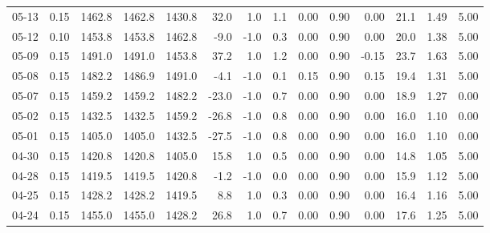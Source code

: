 \begin{threeparttable}
{\begin{tabular}{lrrrrrrrrrrrrr}
  05-13 &     0.15 & 1462.8 & 1462.8 & 1430.8 &       32.0 &                      1.0 &                 1.1 &       0.00 &      0.90 &           0.00 &             21.1 &            1.49 &                   5.00 \\
  05-12 &     0.10 & 1453.8 & 1453.8 & 1462.8 &       -9.0 &                     -1.0 &                 0.3 &       0.00 &      0.90 &           0.00 &             20.0 &            1.38 &                   5.00 \\
  05-09 &     0.15 & 1491.0 & 1491.0 & 1453.8 &       37.2 &                      1.0 &                 1.2 &       0.00 &      0.90 &          -0.15 &             23.7 &            1.63 &                   5.00 \\
  05-08 &     0.15 & 1482.2 & 1486.9 & 1491.0 &       -4.1 &                     -1.0 &                 0.1 &       0.15 &      0.90 &           0.15 &             19.4 &            1.31 &                   5.00 \\
  05-07 &     0.15 & 1459.2 & 1459.2 & 1482.2 &      -23.0 &                     -1.0 &                 0.7 &       0.00 &      0.90 &           0.00 &             18.9 &            1.27 &                   0.00 \\
  05-02 &     0.15 & 1432.5 & 1432.5 & 1459.2 &      -26.8 &                     -1.0 &                 0.8 &       0.00 &      0.90 &           0.00 &             16.0 &            1.10 &                   0.00 \\
  05-01 &     0.15 & 1405.0 & 1405.0 & 1432.5 &      -27.5 &                     -1.0 &                 0.8 &       0.00 &      0.90 &           0.00 &             16.0 &            1.10 &                   0.00 \\
  04-30 &     0.15 & 1420.8 & 1420.8 & 1405.0 &       15.8 &                      1.0 &                 0.5 &       0.00 &      0.90 &           0.00 &             14.8 &            1.05 &                   5.00 \\
  04-28 &     0.15 & 1419.5 & 1419.5 & 1420.8 &       -1.2 &                     -1.0 &                 0.0 &       0.00 &      0.90 &           0.00 &             15.9 &            1.12 &                   5.00 \\
  04-25 &     0.15 & 1428.2 & 1428.2 & 1419.5 &        8.8 &                      1.0 &                 0.3 &       0.00 &      0.90 &           0.00 &             16.4 &            1.16 &                   5.00 \\
  04-24 &     0.15 & 1455.0 & 1455.0 & 1428.2 &       26.8 &                      1.0 &                 0.7 &       0.00 &      0.90 &           0.00 &             17.6 &            1.25 &                   5.00 \\

\end{tabular}}
\end{threeparttable}
